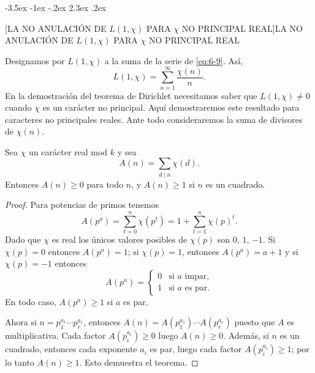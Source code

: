 \documentclass[12pt,a4paper]{book}
\makeatletter
\renewcommand\section{\@startsection{section}{1}{\z@}%
  {-3.5ex \@plus -1ex \@minus -.2ex}%
  {2.3ex \@plus .2ex}%
  {\normalfont\Large\bfseries\raggedright}}
\makeatother
\begin{document}
    \section[LA NO ANULACIÓN DE \texorpdfstring{$L(1,\chi)$}{L(1,χ)} PARA \texorpdfstring{$\chi$}{χ} NO PRINCIPAL REAL]{LA NO ANULACIÓN DE \texorpdfstring{$L(1,\chi)$}{L(1,χ)} PARA \texorpdfstring{$\chi$}{χ} NO PRINCIPAL REAL}

    Designamos por $L(1,\chi)$ a la suma de la serie de \eqref{eq:6-9}. Así,
    \begin{equation*}
        L(1,\chi)=\sum_{n=1}^{\infty}\frac{\chi(n)}{n}.
    \end{equation*}
    En la demostración del teorema de Dirichlet necesitamos saber que $L(1,\chi)\neq0$
    cuando $\chi$ es un carácter no principal. Aquí demostraremos este resultado para
    caracteres no principales reales. Ante todo consideraremos la suma de divisores de
    $\chi(n)$.

    \begin{teorema}
        Sea $\chi$ un carácter real mod $k$ y sea
        \begin{equation*}
            A(n)=\sum_{d\mid n}\chi(d).
        \end{equation*}
        Entonces $A(n)\geq0$ para todo $n$, y $A(n)\geq1$ si $n$ es un cuadrado.
    \end{teorema}

    \begin{proof}
        Para potencias de primos tenemos
        \begin{equation*}
            A(p^{a})=\sum_{t=0}^{a}\chi(p^{t})=1+\sum_{t=1}^{a}\chi(p)^{t}.
        \end{equation*}
        Dado que $\chi$ es real los únicos valores posibles de $\chi(p)$ son $0$, $1$,
        $-1$. Si $\chi(p)=0$ entonces $A(p^{a})=1$; si $\chi(p)=1$, entonces $A(p^{a})=a+1$ y
        si $\chi(p)=-1$ entonces
        \begin{equation*}
            A(p^{a})=
            \begin{cases}
                0&\text{si }a\text{ impar,}\\
                1&\text{si }a\text{ es par.}
            \end{cases}
        \end{equation*}
        En todo caso, $A(p^{a})\geq1$ si $a$ es par.

        Ahora si $n=p_{1}^{a_{1}}\cdots p_{r}^{a_{r}}$, entonces $A(n)=A(p_{1}^{a_{1}})\cdots
        A(p_{r}^{a_{r}})$ puesto que $A$ es multiplicativa. Cada factor $A(p_{i}^{a_{i}})\geq0$
        luego $A(n)\geq0$. Además, si $n$ es un cuadrado, entonces cada exponente $a_{i}$ es
        par, luego cada factor $A(p_{i}^{a_{i}})\geq1$; por lo tanto $A(n)\geq1$. Esto
        demuestra el teorema.
    \end{proof}
\end{document}
